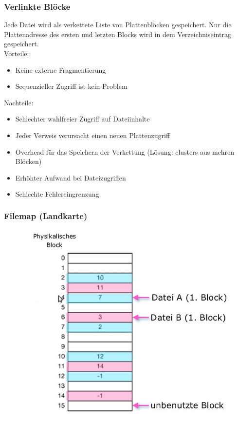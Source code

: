 \documentclass[a4paper, 10pt]{article}
\begin{document}
\subsubsection{Verlinkte Blöcke}
Jede Datei wird als verkettete Liste von Plattenblöcken gespeichert. Nur die Plattenadresse des ersten und letzten Blocks wird in dem Verzeichniseintrag gespeichert.\\
Vorteile:
\begin{itemize}
\item Keine externe Fragmentierung
\item Sequenzieller Zugriff ist kein Problem
\end{itemize}
Nachteile:
\begin{itemize}
\item Schlechter wahlfreier Zugriff auf Dateiinhalte
\item Jeder Verweis verursacht einen neuen Plattenzugriff
\item Overhead für das Speichern der Verkettung (Lösung: clusters aus mehren Blöcken)
\item Erhöhter Aufwand bei Dateizugriffen
\item Schlechte Fehlereingrenzung
\end{itemize}

\subsubsection{Filemap (Landkarte)}
\begin{figure}
\includegraphics[scale=0.4]{filemap.jpg}
\end{figure}
\end{document}
